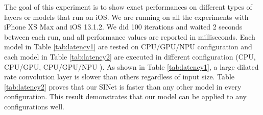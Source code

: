\documentclass[10pt,twocolumn,letterpaper]{article}
\begin{document}
The goal of this experiment is to show exact performances on different types of layers or models that run on iOS.
We are running on all the experiments with iPhone XS Max and iOS 13.1.2.
We did 100 iterations and waited 2 seconds between each run, and all performance values are reported in milliseconds. 
Each model in Table \ref{tab:latency1} are tested on CPU/GPU/NPU configuration and each model in Table \ref{tab:latency2} are executed in different configuration (CPU, CPU/GPU, CPU/GPU/NPU ).
As shown in Table \ref{tab:latency1}, a large dilated rate convolution layer is slower than others regardless of input size.
Table \ref{tab:latency2} proves that our SINet is faster than any other model in every configuration.
This result demonstrates that our model can be applied to any configurations well.


 
\end{document}
